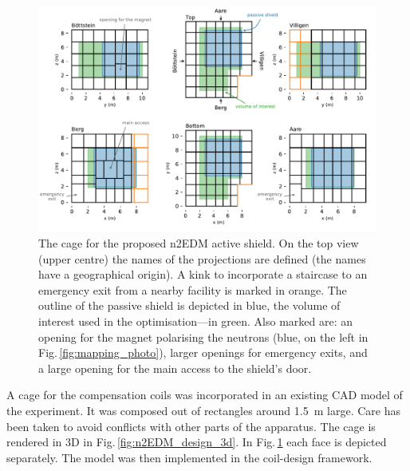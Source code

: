 \begin{figure}
  \centering
  \includegraphics[width=\linewidth]{gfx/prototype/n2EDM_active_shield_all_faces.pdf}
  \caption{The cage for the proposed n2EDM active shield.
  On the top view (upper centre) the names of the projections are defined (the names have a geographical origin).
  A kink to incorporate a staircase to an emergency exit from a nearby facility is marked in orange.
  The outline of the passive shield is depicted in blue,
  the volume of interest used in the optimisation---in green.
  Also marked are: an opening for the magnet polarising the neutrons (blue, on the left in Fig.\,\ref{fig:mapping_photo}), larger openings for emergency exits, and a large opening for the main access to the shield's door.}\label{fig:n2EDM_design_top}
\end{figure}

A cage for the compensation coils was incorporated in an existing CAD model of the experiment.
It was composed out of rectangles around \SI{1.5}{\metre} large.
Care has been taken to avoid conflicts with other parts of the apparatus.
The cage is rendered in 3D in Fig.\,\ref{fig:n2EDM_design_3d}. In Fig.\,\ref{fig:n2EDM_design_top} each face is depicted separately. The model was then implemented in the coil-design framework.


